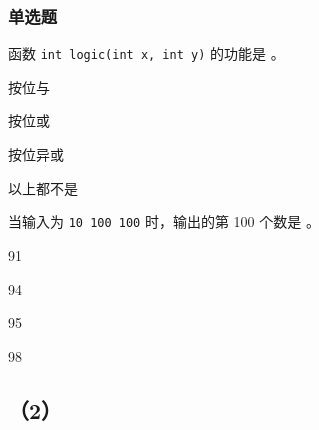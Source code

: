 \documentclass{exam-zh}
\newcommand{\code}[1]{\texttt{#1}}
\begin{document}
    \begin{solution}
        
    \end{solution}
    
    \subsubsection{单选题}
    
    \begin{question}
        函数 \code{int logic(int x, int y)} 的功能是 \paren[B]。

        \begin{choices}
            \item  按位与
            \item  按位或
            \item  按位异或
            \item  以上都不是
        \end{choices}

    \end{question}
    
    \begin{solution}

    \end{solution}

    \begin{question}[points=4, show-points=true]
        当输入为 \code{10 100 100} 时，输出的第 100 个数是 \paren[C]。

        \begin{choices}
            \item 91
            \item 94
            \item 95
            \item 98
        \end{choices}
    \end{question}

\begin{solution}
    
\end{solution}



\newpage


\subsection*{（2）} %
\end{document}
